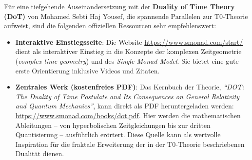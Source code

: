 	Für eine tiefgehende Auseinandersetzung mit der \textbf{Duality of Time Theory (DoT)} von Mohamed Sebti Haj Yousef, die spannende Parallelen zur T0-Theorie aufweist, sind die folgenden offiziellen Ressourcen sehr empfehlenswert:
	
	\begin{itemize}
		\item \textbf{Interaktive Einstiegsseite}: Die Website \href{https://www.smonad.com/start/}{https://www.smonad.com/start/} dient als interaktiver Einstieg in die Konzepte der komplexen Zeitgeometrie (\emph{complex-time geometry}) und des \emph{Single Monad Model}. Sie bietet eine gute erste Orientierung inklusive Videos und Zitaten.
		\item \textbf{Zentrales Werk (kostenfreies PDF)}: Das Kernbuch der Theorie, \emph{``DOT: The Duality of Time Postulate and Its Consequences on General Relativity and Quantum Mechanics''}, kann direkt als PDF heruntergeladen werden: \href{https://www.smonad.com/books/dot.pdf}{https://www.smonad.com/books/dot.pdf}. Hier werden die mathematischen Ableitungen – von hyperbolischen Zeitgleichungen bis zur dritten Quantisierung – ausführlich erörtert. Diese Quelle kann als wertvolle Inspiration für die fraktale Erweiterung der in der T0-Theorie beschriebenen Dualität dienen.
	\end{itemize}
	